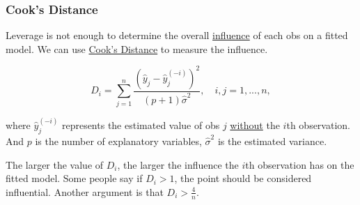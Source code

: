 \documentclass[12pt]{article}
\begin{document}
\begin{figure}[H]
\end{figure}




\subsubsection{Cook's Distance}

Leverage is not enough to determine the overall {\underline {influence}} 
of each obs on a fitted model. We can use {\underline {Cook's
Distance}} to measure the influence.

\begin{equation*}
D_{i} = \sum\limits_{j = 1} ^n
\frac{( \widehat{y}_{j} -  \widehat{y}_{j}^{ (- i)})^{2}}
{(p + 1) \widehat{\sigma}^{2}}, 
\quad i,j = 1,...,n,
\end{equation*}


where $  \widehat{y}_{j}^{( - i)} $ represents the estimated value
of obs $ j $ {\underline {without}} the $ i $th observation. And
$ p $ is the number of explanatory variables, 
$   \widehat{\sigma}^{2} $ is the estimated variance.

The larger the value of $ D_{i} $, the larger the influence the 
$ i $th observation has on the fitted model. 
Some people say if $ D_{i} > 1 $, the point should be considered
influential. Another argument is that $ D_{i} > \frac{4}{n} $.
\end{document}
